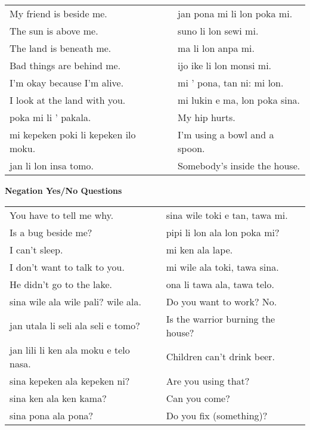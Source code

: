 \begin{supertabular}{p{5,5cm}|ll}
My friend is beside me. && jan pona mi li lon poka mi. \\ %
The sun is above me. && suno li lon sewi mi. \\ %
The land is beneath me. && ma li lon anpa mi. \\ %
Bad things are behind me. && ijo ike li lon monsi mi. \\ %
I'm okay because I'm alive. && mi ' pona, tan ni: mi lon. \\ %
I look at the land with you.  && mi lukin e ma, lon poka sina. \\ %
poka mi li ' pakala.  && My hip hurts. \\
mi kepeken poki li kepeken ilo moku.  && I'm using a bowl and a spoon. \\
jan li lon insa tomo.  && Somebody's inside the house. \\
\end{supertabular} 

\textbf{Negation Yes/No Questions} 
\label{'negation_yes_no_questions'}

\begin{supertabular}{p{5,5cm}|ll}
You have to tell me why.  && sina wile toki e tan, tawa mi. \\ %
Is a bug beside me?  && pipi li lon ala lon poka mi? \\ %
I can't sleep.  && mi ken ala lape. \\ %
I don't want to talk to you.  && mi wile ala toki, tawa sina. \\ %
He didn't go to the lake.  && ona li tawa ala, tawa telo. \\ %
sina wile ala wile pali? wile ala.  && Do you want to work? No. \\
jan utala li seli ala seli e tomo?  && Is the warrior burning the house? \\
jan lili li ken ala moku e telo nasa.  && Children can't drink beer. \\
sina kepeken ala kepeken ni?  && Are you using that? \\
sina ken ala ken kama?  && Can you come? \\
sina pona ala pona? && Do you fix (something)? \\
\end{supertabular} 

